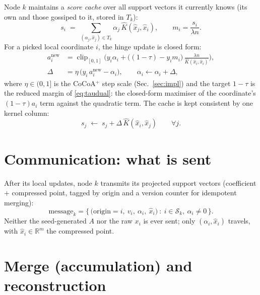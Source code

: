 \documentclass[11pt]{article}
\newcommand{\R}{\mathbb{R}}
\DeclareMathOperator{\clip}{clip}
\begin{document}
Node $k$ maintains a \emph{score cache} over all support vectors it currently knows
(its own and those gossiped to it, stored in $T_k$):
\begin{equation}\label{eq:score}
  s_i \;=\; \sum_{(\alpha_j,\hat x_j)\in T_k}\alpha_j\,\hat K(\hat x_j,\hat x_i),
  \qquad
  m_i=\frac{s_i}{\lambda n}.
\end{equation}
For a picked local coordinate $i$, the hinge update is closed form:
\begin{align}
  a_i^{\text{new}} &= \clip_{[0,1]}\!\Big(y_i\alpha_i
      + \big((1-\tau)-y_i m_i\big)\,\frac{\lambda n}{\hat K(\hat x_i,\hat x_i)}\Big),
      \label{eq:clip}\\
  \Delta &= \eta\,\big(y_i\,a_i^{\text{new}}-\alpha_i\big), \qquad \alpha_i\leftarrow\alpha_i+\Delta,
      \label{eq:delta}
\end{align}
where $\eta\in(0,1]$ is the CoCoA$^+$ step scale (Sec.~\ref{sec:impl}) and the
target $1-\tau$ is the reduced margin of \eqref{eq:taudual}: the closed-form
maximiser of the coordinate's $(1-\tau)a_i$ term against the quadratic term. The cache is kept
consistent by one kernel column:
\begin{equation}\label{eq:cacheupd}
  s_j \;\leftarrow\; s_j + \Delta\,\hat K(\hat x_i,\hat x_j)\qquad\forall j .
\end{equation}

\section{Communication: what is sent}

After its local updates, node $k$ transmits its projected support vectors
(coefficient $+$ compressed point, tagged by origin and a version counter for
idempotent merging):
\begin{equation}\label{eq:msg}
  \text{message}_k=\Big\{\,\big(\text{origin}=i,\ v_i,\ \alpha_i,\ \hat x_i\big)
  \ :\ i\in\mathcal{S}_k,\ \alpha_i\neq0\,\Big\}.
\end{equation}
Neither the seed-generated $A$ nor the raw $x_i$ is ever sent; only
$(\alpha_i,\hat x_i)$ travels, with $\hat x_i\in\R^{m}$ the compressed point.

\section{Merge (accumulation) and reconstruction}
\end{document}

